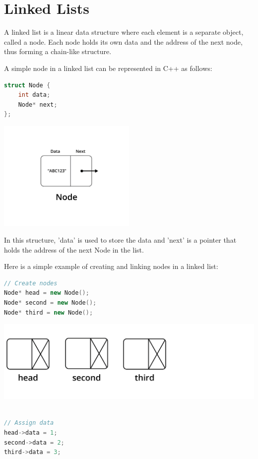 \chapter{Linked Lists}

A linked list is a linear data structure where each element is a
separate object, called a node. Each node holds its own data and the
address of the next node, thus forming a chain-like structure.

A simple node in a linked list can be represented in C++ as follows:



\begin{lstlisting}[language=C++]
struct Node {
    int data;
    Node* next;
};
\end{lstlisting}

\includegraphics[width=0.5\textwidth]{node.png}


In this structure, 'data' is used to store the data and 'next' is a
pointer that holds the address of the next Node in the list.



Here is a simple example of creating and linking nodes in a linked
list:

\begin{lstlisting}[language=C++]
// Create nodes
Node* head = new Node();
Node* second = new Node();
Node* third = new Node();
\end{lstlisting}

\includegraphics[width=.75\textwidth]{llexample-03.png}

\begin{lstlisting}[language=C++]

// Assign data
head->data = 1;
second->data = 2;
third->data = 3;
\end{lstlisting}

